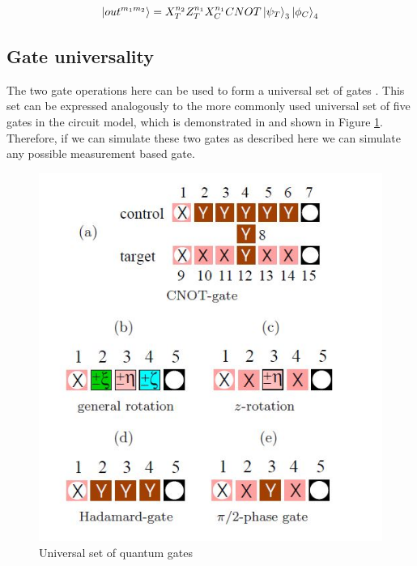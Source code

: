 \begin{equation}
\label{eq:CNOT_qbit_feed_forward}
\ket{out^{m_{1} m_{2}}} = X^{n_{2}}_{T} Z^{n_{1}}_{T} X^{n_{1}}_{C} CNOT \ket{\psi_{T}}_{3} \ket{\phi_{C}}_{4}
\end{equation}


\subsection{Gate universality}

The two gate operations here can be used to form a universal set of gates \citep{raussendorf_quantum_2000}. This set can be expressed analogously to the more commonly used universal set of five gates in the circuit model, which is demonstrated in \citep{raussendorf_measurement-based_2003} and shown in Figure \ref{fig:universal_set}. Therefore, if we can simulate these two gates as described here we can simulate any possible measurement based gate. 

\begin{figure}
\includegraphics[scale=0.8]{gfx/gates.JPG}
\caption{Universal set of quantum gates \citep{raussendorf_measurement-based_2003}}
\label{fig:universal_set}
\end{figure}